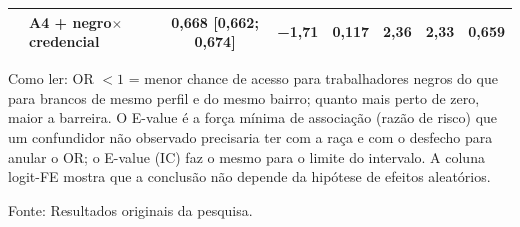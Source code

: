 \documentclass[11pt, a4paper, oneside]{article}
\begin{document}
\begin{table}[!ht]
{\begin{tabular}{llcccccc}
 & A4 + negro$\times$credencial & 0,668 [0,662; 0,674] & −1,71 & 0,117 & 2,36 & 2,33 & 0,659 \\
\bottomrule
\end{tabular}}
\par\smallskip
\footnotesize{Como ler:} OR $<1$ = menor chance de acesso para trabalhadores negros do que para brancos de mesmo perfil {e do mesmo bairro}; quanto mais perto de zero, maior a barreira. O E-value é a força mínima de associação (razão de risco) que um confundidor não observado precisaria ter com a raça {e} com o desfecho para anular o OR; o E-value (IC) faz o mesmo para o limite do intervalo. A coluna logit-FE mostra que a conclusão não depende da hipótese de efeitos aleatórios.
\par\smallskip\footnotesize Fonte: Resultados originais da pesquisa.
\end{table}
\end{document}
